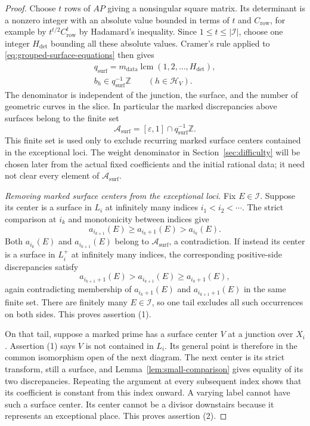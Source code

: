 \documentclass[11pt]{amsart}
\theoremstyle{definition}
\theoremstyle{remark}
\numberwithin{equation}{section}
\newcommand{\Z}{\mathbb{Z}}
\begin{document}
\begin{proof}
Choose $t$ rows of $AP$ giving a nonsingular square matrix.  Its
determinant is a nonzero integer with an absolute value bounded in terms
of $t$ and $C_{\mathrm{row}}$, for example by
$t^{t/2}C_{\mathrm{row}}^t$ by Hadamard's inequality.  Since
$1\leq t\leq|\mathcal I|$, choose one integer $H_{\mathrm{det}}$ bounding
all these absolute values.  Cramer's rule applied to
\eqref{eq:grouped-surface-equations} then gives
\[
 \begin{gathered}
 q_{\mathrm{surf}}=
 m_{\mathrm{data}}\operatorname{lcm}(1,2,\ldots,H_{\mathrm{det}}),
 \\
 b_h\in q_{\mathrm{surf}}^{-1}\Z\qquad(h\in\mathcal H_V).
 \end{gathered}
\]
The denominator is independent of the junction, the surface, and the
number of geometric curves in the slice.  In particular the marked
discrepancies above surfaces belong to the finite set
\begin{equation}\label{eq:marked-surface-discrepancies}
          \mathcal A_{\mathrm{surf}}
          =[\varepsilon,1]\cap q_{\mathrm{surf}}^{-1}\Z.
\end{equation}
This finite set is used only to exclude recurring marked surface centers
contained in the exceptional loci.  The weight denominator in
Section~\ref{sec:difficulty} will be chosen later from the actual fixed
coefficients and the initial rational data; it need not clear every element
of $\mathcal A_{\mathrm{surf}}$.

\medskip\noindent\emph{Removing marked surface centers from the exceptional loci.}
Fix $E\in\mathcal I$.  Suppose its center is a surface in $L_i$ at
infinitely many indices $i_1<i_2<\cdots$.  The strict comparison at
$i_k$ and monotonicity between indices give
\[
                  a_{i_{k+1}}(E)\geq a_{i_k+1}(E)>a_{i_k}(E).
\]
Both $a_{i_k}(E)$ and $a_{i_{k+1}}(E)$ belong to
$\mathcal A_{\mathrm{surf}}$, a contradiction.  If instead its center is
a surface in $L_i^+$ at
infinitely many indices, the corresponding positive-side discrepancies
satisfy
\[
             a_{i_{k+1}+1}(E)>a_{i_{k+1}}(E)\geq a_{i_k+1}(E),
\]
again contradicting membership of $a_{i_k+1}(E)$ and
$a_{i_{k+1}+1}(E)$ in the same finite set.  There are finitely many
$E\in\mathcal I$, so one tail excludes all
such occurrences on both sides.  This proves assertion (1).

On that tail, suppose a marked prime has a surface center $V$ at a
junction over $X_i$.  Assertion (1) says $V$ is not contained in $L_i$.
Its general point is therefore in the common isomorphism open of the
next diagram.  The next center is its strict transform, still a surface,
and Lemma~\ref{lem:small-comparison} gives equality of its two
discrepancies.  Repeating the argument at every subsequent index shows
that its coefficient is constant from this index onward.  A varying label
cannot have such a surface center.  Its center cannot be a divisor
downstairs because it represents an exceptional place.  This proves
assertion (2).


\end{proof}
\end{document}
